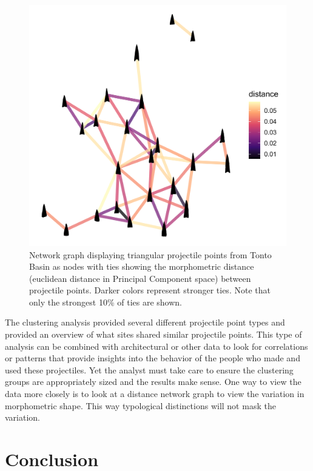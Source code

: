 \documentclass[letterpaper]{article}
\begin{document}
\begin{figure}
\includegraphics[width=1\linewidth]{figures/TontoTriangularDistanceNetwork} \caption{Network graph displaying triangular projectile points from Tonto Basin as nodes with ties showing the morphometric distance (euclidean distance in Principal Component space) between projectile points. Darker colors represent stronger ties. Note that only the strongest 10\% of ties are shown.}\label{fig:TontoTriangularDistanceNetwork}
\end{figure}

The clustering analysis provided several different projectile point types and provided an overview of what sites shared similar projectile points. This type of analysis can be combined with architectural or other data to look for correlations or patterns that provide insights into the behavior of the people who made and used these projectiles. Yet the analyst must take care to ensure the clustering groups are appropriately sized and the results make sense. One way to view the data more closely is to look at a distance network graph to view the variation in morphometric shape. This way typological distinctions will not mask the variation.

\hypertarget{conclusion}{%
\section*{Conclusion}\label{conclusion}}
\end{document}
